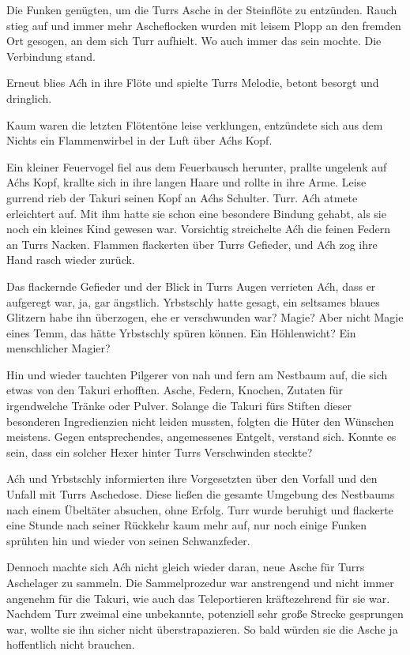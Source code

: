 Die Funken genügten, um die Turrs Asche in der Steinflöte zu entzünden. Rauch stieg auf und immer mehr Ascheflocken wurden mit leisem Plopp an den fremden Ort gesogen, an dem sich Turr aufhielt. Wo auch immer das sein mochte. Die Verbindung stand.

Erneut blies Aćh in ihre Flöte und spielte Turrs Melodie, betont besorgt und dringlich.

Kaum waren die letzten Flötentöne leise verklungen, entzündete sich aus dem Nichts ein Flammenwirbel in der Luft über Aćhs Kopf.

Ein kleiner Feuervogel fiel aus dem Feuerbausch herunter, prallte ungelenk auf Aćhs Kopf, krallte sich in ihre langen Haare und rollte in ihre Arme. Leise gurrend rieb der Takuri seinen Kopf an Aćhs Schulter. Turr. Aćh atmete erleichtert auf. Mit ihm hatte sie schon eine besondere Bindung gehabt, als sie noch ein kleines Kind gewesen war. Vorsichtig streichelte Aćh die feinen Federn an Turrs Nacken. Flammen flackerten über Turrs Gefieder, und Aćh zog ihre Hand rasch wieder zurück.

Das flackernde Gefieder und der Blick in Turrs Augen verrieten Aćh, dass er aufgeregt war, ja, gar ängstlich. Yrbstschly hatte gesagt, ein seltsames blaues Glitzern habe ihn überzogen, ehe er verschwunden war? Magie? Aber nicht Magie eines Temm, das hätte Yrbstschly spüren können. Ein Höhlenwicht? Ein menschlicher Magier?

Hin und wieder tauchten Pilgerer von nah und fern am Nestbaum auf, die sich etwas von den Takuri erhofften. Asche, Federn, Knochen, Zutaten für irgendwelche Tränke oder Pulver. Solange die Takuri fürs Stiften dieser besonderen Ingredienzien nicht leiden mussten, folgten die Hüter den Wünschen meistens. Gegen entsprechendes, angemessenes Entgelt, verstand sich. Konnte es sein, dass ein solcher Hexer hinter Turrs Verschwinden steckte?

Aćh und Yrbstschly informierten ihre Vorgesetzten über den Vorfall und den Unfall mit Turrs Aschedose. Diese ließen die gesamte Umgebung des Nestbaums nach einem Übeltäter absuchen, ohne Erfolg. Turr wurde beruhigt und flackerte eine Stunde nach seiner Rückkehr kaum mehr auf, nur noch einige Funken sprühten hin und wieder von seinen Schwanzfeder.

Dennoch machte sich Aćh nicht gleich wieder daran, neue Asche für Turrs Aschelager zu sammeln. Die Sammelprozedur war anstrengend und nicht immer angenehm für die Takuri, wie auch das Teleportieren kräftezehrend für sie war. Nachdem Turr zweimal eine unbekannte, potenziell sehr große Strecke gesprungen war, wollte sie ihn sicher nicht überstrapazieren. So bald würden sie die Asche ja hoffentlich nicht brauchen.



